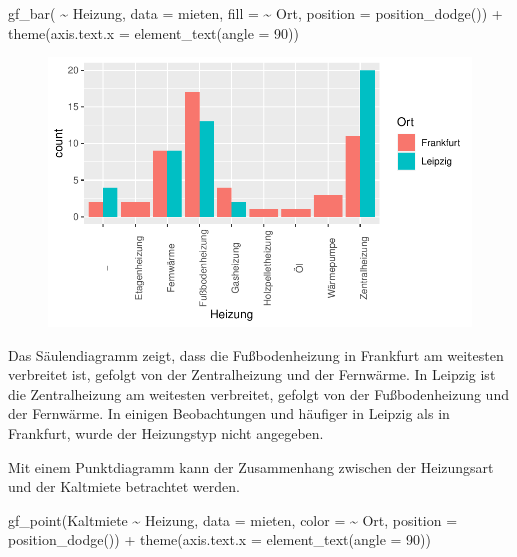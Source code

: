 \documentclass[
  a4paper,
  DIV=11]{scrartcl}
\newenvironment{Shaded}{\begin{snugshade}}{\end{snugshade}}
\newcommand{\AttributeTok}[1]{\textcolor[rgb]{0.40,0.45,0.13}{#1}}
\newcommand{\DecValTok}[1]{\textcolor[rgb]{0.68,0.00,0.00}{#1}}
\newcommand{\FunctionTok}[1]{\textcolor[rgb]{0.28,0.35,0.67}{#1}}
\newcommand{\NormalTok}[1]{\textcolor[rgb]{0.00,0.23,0.31}{#1}}
\newcommand{\SpecialCharTok}[1]{\textcolor[rgb]{0.37,0.37,0.37}{#1}}
\begin{document}
\begin{Shaded}
\begin{Highlighting}[]
\FunctionTok{gf\_bar}\NormalTok{( }\SpecialCharTok{\textasciitilde{}}\NormalTok{ Heizung, }\AttributeTok{data =}\NormalTok{ mieten, }\AttributeTok{fill =} \SpecialCharTok{\textasciitilde{}}\NormalTok{ Ort, }\AttributeTok{position =} \FunctionTok{position\_dodge}\NormalTok{()) }\SpecialCharTok{+} 
  \FunctionTok{theme}\NormalTok{(}\AttributeTok{axis.text.x =} \FunctionTok{element\_text}\NormalTok{(}\AttributeTok{angle =} \DecValTok{90}\NormalTok{))}
\end{Highlighting}
\end{Shaded}

\begin{figure}[H]

{\centering \includegraphics{Mietmodellierung_files/figure-pdf/unnamed-chunk-12-1.pdf}

}

\end{figure}

Das Säulendiagramm zeigt, dass die Fußbodenheizung in Frankfurt am
weitesten verbreitet ist, gefolgt von der Zentralheizung und der
Fernwärme. In Leipzig ist die Zentralheizung am weitesten verbreitet,
gefolgt von der Fußbodenheizung und der Fernwärme. In einigen
Beobachtungen und häufiger in Leipzig als in Frankfurt, wurde der
Heizungstyp nicht angegeben.

Mit einem Punktdiagramm kann der Zusammenhang zwischen der Heizungsart
und der Kaltmiete betrachtet werden.

\begin{Shaded}
\begin{Highlighting}[]
\FunctionTok{gf\_point}\NormalTok{(Kaltmiete }\SpecialCharTok{\textasciitilde{}}\NormalTok{ Heizung, }\AttributeTok{data =}\NormalTok{ mieten, }\AttributeTok{color =} \SpecialCharTok{\textasciitilde{}}\NormalTok{ Ort, }\AttributeTok{position =} \FunctionTok{position\_dodge}\NormalTok{()) }\SpecialCharTok{+} 
  \FunctionTok{theme}\NormalTok{(}\AttributeTok{axis.text.x =} \FunctionTok{element\_text}\NormalTok{(}\AttributeTok{angle =} \DecValTok{90}\NormalTok{))}
\end{Highlighting}
\end{Shaded}
\end{document}
